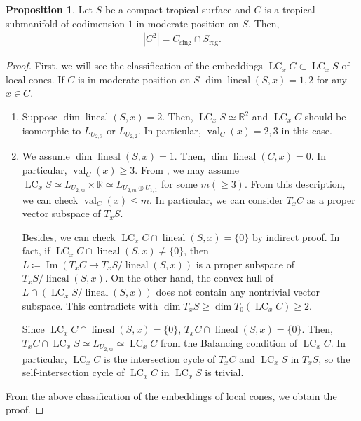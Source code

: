 \documentclass[a4paper,dvipdfmx,reqno,12pt]{amsart}
\theoremstyle{definition}
\newtheorem{proposition}[theorem]{Proposition}
\newcommand{\deq}{\coloneqq}
\newcommand{\opn}[1]{\operatorname{#1}}
\numberwithin{equation}{section}
\begin{document}
\begin{proposition}
\label{proposition-self-intersection}
Let $S$ be a compact tropical surface
and $C$ is a tropical submanifold of codimension $1$
in moderate position on $S$. Then, 
\begin{align}
     |C^2|= C_{\mathrm{sing}}\cap S_{\mathrm{reg}}.
\end{align} 
\end{proposition}
\begin{proof}
First, we will see the classification of
the embeddings
$\opn{LC}_x C \subset \opn{LC}_x S$ of local cones.
If $C$ is in moderate position on $S$
$\dim \opn{lineal}(S,x)=1,2$ for any $x\in C$.
\begin{enumerate}[align=left,leftmargin=*]
\item Suppose $\dim \opn{lineal}(S,x)=2$.
Then, $\opn{LC}_x S\simeq \mathbb{R}^2$ and
$\opn{LC}_x C$ should be isomorphic to 
$L_{U_{2,3}}$ or $L_{U_{2,2}}$. 
In particular, $\opn{val}_C(x)=2,3$ in this case.
\item We assume $\dim \opn{lineal}(S,x)=1$. 
Then, $\dim \opn{lineal}(C,x)=0$.
In particular, $\opn{val}_C(x)\geq 3$.
From \cite[Corollary 2.4]{shaw2015tropical}, 
we may assume $\opn{LC}_x S\simeq L_{U_{2,m}}\times \mathbb{R}
\simeq L_{U_{2,m}\oplus U_{1,1}}$
for some $m(\geq 3)$.
From this description, we can check $\opn{val}_C(x)\leq m$.
In particular, we can consider $T_x C$ as 
a proper vector subspace of $T_x S$.



Besides, we can check 
$\opn{LC}_x C\cap \opn{lineal}(S,x)=\{0\}$
by indirect proof.
In fact, if $\opn{LC}_x C\cap \opn{lineal}(S,x)\ne \{0\}$,
then $L\deq \opn{Im} (T_x C\to T_x S/\opn{lineal}(S,x))$ is a
proper subspace of $T_x S/\opn{lineal}(S,x)$.
On the other hand,
the convex hull of 
$L\cap (\opn{LC}_x S/\opn{lineal}(S,x))$
does not contain any nontrivial vector subspace.
This contradicts with $\dim T_x S\geq \dim T_0(\opn{LC}_x C)\geq 2$.

Since $\opn{LC}_x C\cap \opn{lineal}(S,x)=\{0\}$,
$T_x C\cap \opn{lineal}(S,x)=\{0\}$. Then,
$T_x C\cap \opn{LC}_x S\simeq L_{U_{2,m}}\simeq \opn{LC}_x C$
from the Balancing condition of $\opn{LC}_x C$.
In particular, $\opn{LC}_x C$ is the intersection cycle of
$T_x C$ and $\opn{LC}_x S$ in $T_x S$, so the self-intersection cycle
of $\opn{LC}_x C$ in $\opn{LC}_x S$ is trivial.
\end{enumerate}
From the above classification of the embeddings
of local cones, we obtain the proof. 

\end{proof}
\end{document}
